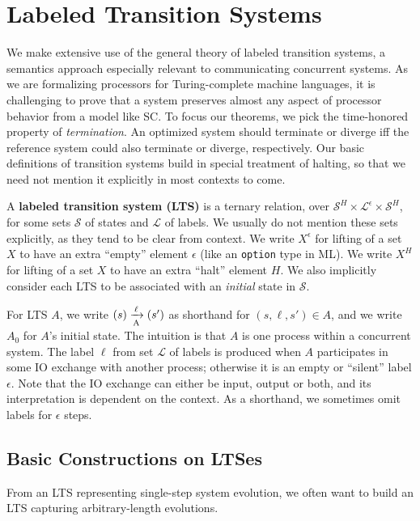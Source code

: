 \section{Labeled Transition Systems}\label{sec:lts}

We make extensive use of the general theory of labeled transition
systems, a semantics approach especially relevant to communicating
concurrent systems.  As we are formalizing processors for
Turing-complete machine languages, it is challenging to prove that a
system preserves almost any aspect of processor behavior from a model
like SC.  To focus our theorems, we pick the time-honored property of
\emph{termination}.  An optimized system should terminate or diverge
iff the reference system could also terminate or diverge,
respectively.  Our basic definitions of transition systems build in
special treatment of halting, so that we need not mention it
explicitly in most contexts to come.

\begin{defn}
A \textbf{labeled transition system (LTS)} is a ternary relation, over
$\mathcal S^H \times \mathcal L^\epsilon \times \mathcal S^H$, for some sets
$\mathcal S$ of states and $\mathcal L$ of labels. We usually do not mention
these sets explicitly, as they tend to be clear from context. We write
$X^\epsilon$ for lifting of a set $X$ to have an extra ``empty'' element
$\epsilon$ (like an \texttt{option} type in ML). We write $X^H$ for lifting of
a set $X$ to have an extra ``halt'' element $H$. We also implicitly consider
each LTS to be associated with an \emph{initial} state in $\mathcal S$.
\end{defn}

For LTS $A$, we write $\io{A}{s}{s'}{\ell}$ as shorthand for $(s, \ell, s') \in
A$, and we write $A_0$ for $A$'s initial state. The intuition is that $A$ is
one process within a concurrent system. The label $\ell$ from set $\mathcal L$
of labels is produced when $A$ participates in some IO exchange with another
process; otherwise it is an empty or ``silent'' label $\epsilon$. Note that the
IO exchange can either be input, output or both, and its interpretation is
dependent on the context. As a shorthand, we sometimes omit labels for
$\epsilon$ steps.

\subsection{Basic Constructions on LTSes}

From an LTS representing single-step system evolution, we often want to build
an LTS capturing arbitrary-length evolutions.

